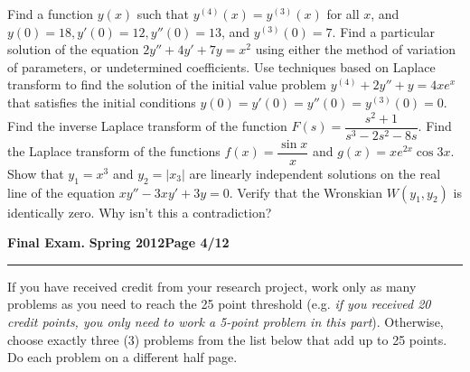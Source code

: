 \documentclass[12pt]{article}
\begin{document}
{\problem[5pts] Find a function $y(x)$ such that $y^{(4)}(x)=y^{(3)}(x)$ for
all $x$, and $y(0)=18, y'(0)=12, y''(0)=13$, and $y^{(3)}(0)=7$.}
{\problem[10pts] Find a particular solution of the equation $2y''+4y'+7y=x^2$ using either the method of variation of parameters, or undetermined coefficients}.
{\problem[10pts] Use techniques based on Laplace transform to find the solution
of the initial value problem $y^{(4)}+2y''+y=4xe^x$ that satisfies the initial
conditions $y(0)=y'(0)=y''(0)=y^{(3)}(0)=0$.}
{\problem[5pts] Find the inverse Laplace transform of the function $F(s) =
\dfrac{s^2+1}{s^3-2s^2-8s}$.}
{\problem[10pts] Find the Laplace transform of the functions $f(x)=\dfrac{\sin
x}{x}$ and $g(x) = xe^{2x}\cos 3x$.}
{\problem[5pts] Show that $y_1=x^3$ and $y_2=\lvert x_3 \rvert$ are linearly
independent solutions on the real line of the equation $xy''-3xy'+3y=0$.
Verify that the Wronskian $W(y_1,y_2)$ is identically zero.  Why isn't this a
contradiction?}
\newpage

\hfill{\large\bf Final Exam.}\hfill{\large\bf
  Spring 2012}\hfill{\large\bf Page 4/12}\hrule

\vspace{0.5cm}
 If you have received credit from your research
project, work only as many problems as you need to reach the 25 point threshold
(e.g. \textit{if you received 20 credit points, you only need to work a 5-point
problem in this part}).  Otherwise, choose exactly three (3) problems from the
list below that add up to 25 points.   Do each problem on a different half
page.
\end{document}
